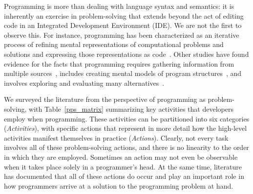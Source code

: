 Programming is more than dealing with language syntax and semantics: it is inherently an exercise in problem-solving that extends beyond the act of editing code in an Integrated Development Environment (IDE).
We are not the first to observe this.
For instance, programming has been characterized as an iterative process of refining mental representations of computational problems and solutions and expressing those representations as code~\cite{loksa2016programming}.
Other studies have found evidence for the facts that programming requires gathering information from multiple sources~\cite{sillito2008asking}, includes creating mental models of program structures~\cite{von1995comprehension}, and involves exploring and evaluating many alternatives~\cite{hartmann2008design}.


We surveyed the literature from the perspective of programming as problem-solving, with Table~\ref{pps_matrix} summarizing key activities that developers employ when programming. These activities can be partitioned into six categories (\textit{Activities}), with specific actions that represent in more detail how the high-level activities manifest themselves in practice (\textit{Actions}).
Clearly, not every task involves all of these problem-solving actions, and there is no linearity to the order in which they are employed.
Sometimes an action may not even be observable when it takes place solely in a programmer's head.
At the same time, literature has documented that all of these actions do occur and play an important role in how programmers arrive at a solution to the programming problem at hand.

